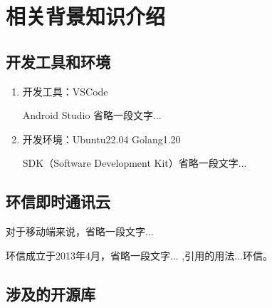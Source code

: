 \section{相关背景知识介绍}

	\subsection{开发工具和环境}
  
  	\begin{enumerate}[fullwidth,itemindent=2em,listparindent=2em]

  		\item 开发工具：VSCode 
 	
 		Android Studio 省略一段文字...
 			
		\item   开发环境：Ubuntu22.04 Golang1.20
	
		SDK（Software Development Kit）省略一段文字...
  
  	
  	\end{enumerate}
     
    \subsection{环信即时通讯云}
    
    对于移动端来说，省略一段文字...
        
    环信成立于2013年4月，省略一段文字...   ,引用的用法...环信。
    
    \subsection{涉及的开源库}
	
